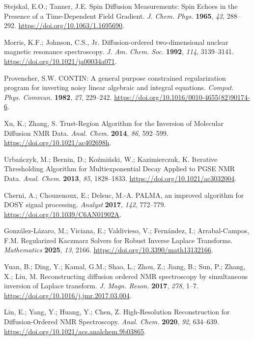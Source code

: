 Stejskal, E.O.; Tanner, J.E. Spin Diffusion Measurements: Spin Echoes in the Presence of a Time-Dependent Field Gradient. \emph{J. Chem. Phys.} \textbf{1965}, \emph{42}, 288--292. \url{https://doi.org/10.1063/1.1695690}.

Morris, K.F.; Johnson, C.S., Jr. Diffusion-ordered two-dimensional nuclear magnetic resonance spectroscopy. \emph{J. Am. Chem. Soc.} \textbf{1992}, \emph{114}, 3139--3141. \url{https://doi.org/10.1021/ja00034a071}.

Provencher, S.W. CONTIN: A general purpose constrained regularization program for inverting noisy linear algebraic and integral equations. \emph{Comput. Phys. Commun.} \textbf{1982}, \emph{27}, 229--242. \url{https://doi.org/10.1016/0010-4655(82)90174-6}.

Xu, K.; Zhang, S. Trust-Region Algorithm for the Inversion of Molecular Diffusion NMR Data. \emph{Anal. Chem.} \textbf{2014}, \emph{86}, 592--599. \url{https://doi.org/10.1021/ac402698h}.

Urba\'nczyk, M.; Bernin, D.; Ko\'zmi\'nski, W.; Kazimierczuk, K. Iterative Thresholding Algorithm for Multiexponential Decay Applied to PGSE NMR Data. \emph{Anal. Chem.} \textbf{2013}, \emph{85}, 1828--1833. \url{https://doi.org/10.1021/ac3032004}.

Cherni, A.; Chouzenoux, E.; Delsuc, M.-A. PALMA, an improved algorithm for DOSY signal processing. \emph{Analyst} \textbf{2017}, \emph{142}, 772--779. \url{https://doi.org/10.1039/C6AN01902A}.

Gonz\'alez-L\'azaro, M.; Viciana, E.; Valdivieso, V.; Fern\'andez, I.; Arrabal-Campos, F.M. Regularized Kaczmarz Solvers for Robust Inverse Laplace Transforms. \emph{Mathematics} \textbf{2025}, \emph{13}, 2166. \url{https://doi.org/10.3390/math13132166}.

Yuan, B.; Ding, Y.; Kamal, G.M.; Shao, L.; Zhou, Z.; Jiang, B.; Sun, P.; Zhang, X.; Liu, M. Reconstructing diffusion ordered NMR spectroscopy by simultaneous inversion of Laplace transform. \emph{J. Magn. Reson.} \textbf{2017}, \emph{278}, 1--7. \url{https://doi.org/10.1016/j.jmr.2017.03.004}.

Lin, E.; Yang, Y.; Huang, Y.; Chen, Z. High-Resolution Reconstruction for Diffusion-Ordered NMR Spectroscopy. \emph{Anal. Chem.} \textbf{2020}, \emph{92}, 634--639. \url{https://doi.org/10.1021/acs.analchem.9b03865}.

